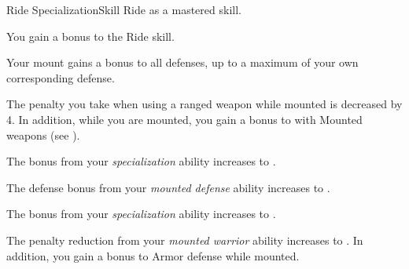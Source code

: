     \begin{feat}{Ride Specialization}{Skill}
        \featpre Ride as a mastered skill.

         You gain a  bonus to the Ride skill.

         Your mount gains a  bonus to all defenses, up to a maximum of your own corresponding defense.

         The penalty you take when using a ranged weapon while mounted is decreased by 4.
        In addition, while you are mounted, you gain a  bonus to  with Mounted weapons (see ).

         The bonus from your \textit{specialization} ability increases to .

         The defense bonus from your \textit{mounted defense} ability increases to .

         The bonus from your \textit{specialization} ability increases to .

         The penalty reduction from your \textit{mounted warrior} ability increases to .
        In addition, you gain a  bonus to Armor defense while mounted.
    \end{feat}

